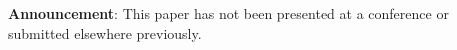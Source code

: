 \hspace{-17pt}\textbf{Announcement}: 
This paper has not been presented at a conference or submitted elsewhere previously.\\